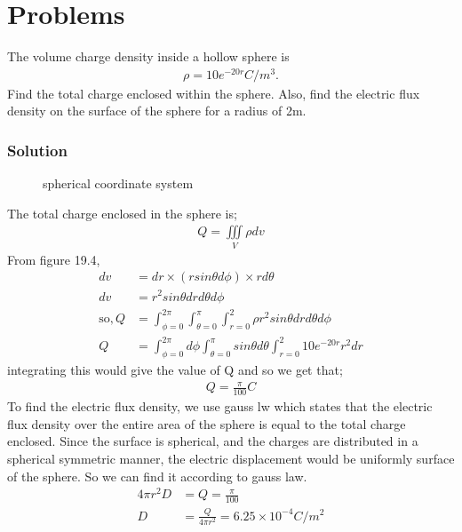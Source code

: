 \section{Problems}
\begin{example}
The volume charge density inside a hollow sphere is 
\begin{align*}
\rho=10e^{-20r} C/m^{3}.
\end{align*}
Find the total charge enclosed within the sphere. Also, find the electric flux density on the surface of the sphere for a radius of 2m.

\subsubsection*{Solution}
\begin{figure}[h]
\centering
\caption{spherical coordinate system}
\end{figure} 

The total charge enclosed in the sphere is;
\begin{align*}
Q=\iiint\limits_V\rho dv
\end{align*}
From figure 19.4, 
\begin{align*}
dv &= dr\times(rsin\theta d\phi)\times rd\theta \\
dv&=r^{2}sin\theta drd\theta d\phi\\
\text{so}, Q&=\int^{2\pi}_{\phi=0}\int^{\pi}_{\theta=0}\int^{2}_{r=0} \rho r^{2}sin\theta drd\theta d\phi\\
Q&= \int^{2\pi}_{\phi=0}d\phi\int^{\pi}_{\theta=0}sin\theta d\theta\int^{2}_{r=0}10e^{-20r}r^{2}dr
\end{align*}
integrating this would give the value of Q and so we get that;
\begin{align*}
Q=\frac{\pi}{100} C
\end{align*}
To find the electric flux density, we use gauss lw which states that the electric flux density over the entire area of the sphere is equal to the total charge enclosed. Since the surface is  spherical, and the charges are distributed in a spherical symmetric manner, the electric displacement would be uniformly surface of the sphere. So we can find it according to gauss law.
\begin{align*}
4\pi r^{2}D&=Q=\frac{\pi}{100}\\
D&=\frac{Q}{4\pi r^{2}}= 6.25\times10^{-4} C/m^{2}
\end{align*}
\end{example}

